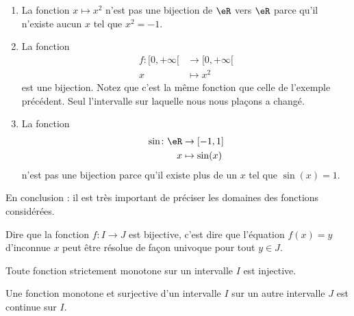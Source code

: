 \begin{example}
    \begin{enumerate}
        \item
            La fonction \( x\mapsto x^2\) n'est pas une bijection de \( \eR\) vers \( \eR\) parce qu'il n'existe aucun \( x\) tel que \( x^2=-1\).
        \item
            La fonction 
            \begin{equation}
                \begin{aligned}
                    f\colon \mathopen[ 0 , +\infty [&\to \mathopen[ 0 , +\infty [ \\
                    x&\mapsto x^2 
                \end{aligned}
            \end{equation}
            est une bijection. Notez que c'est la même fonction que celle de l'exemple précédent. Seul l'intervalle sur laquelle nous nous plaçons a changé.
        \item
            La fonction 
            \begin{equation}
                \begin{aligned}
                    \sin\colon \eR&\to \mathopen[ -1 , 1 \mathclose] \\
                    x&\mapsto \sin(x) 
                \end{aligned}
            \end{equation}
            n'est pas une bijection parce qu'il existe plus de un \( x\) tel que \( \sin(x)=1\). 
    \end{enumerate}
    En conclusion : il est très important de préciser les domaines des fonctions considérées.
\end{example}

\begin{remark}
    Dire que la fonction \( f\colon I\to J\) est bijective, c'est dire que l'équation \( f(x)=y\) d'inconnue \( x\) peut être résolue de façon univoque pour tout \( y\in J\).
\end{remark}

\begin{remark}
  Toute fonction strictement monotone sur un intervalle $I$ est injective. 
\end{remark}

\begin{proposition} \label{PropOARooUuCaYT}
    Une fonction monotone et surjective d'un intervalle $I$ sur un autre intervalle $J$ est continue sur $I$.
\end{proposition}

